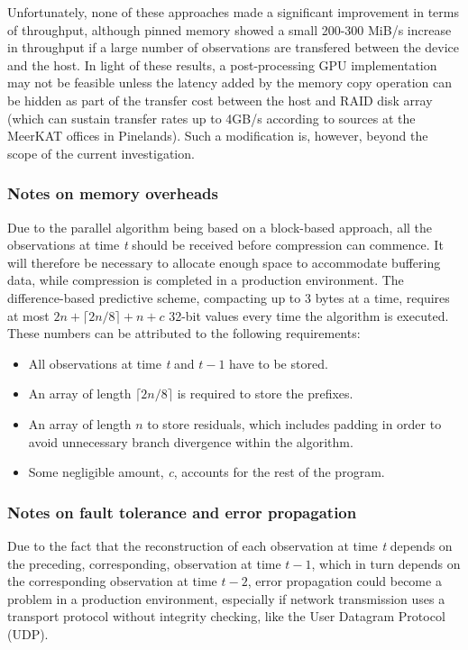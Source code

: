   Unfortunately, none of these approaches made a significant improvement in terms of throughput, although pinned memory showed a small 200-300 MiB/s increase in throughput if a large number of observations are transfered between the 
  device and the host. In light of these results, a post-processing GPU implementation may not be feasible unless the latency added by the memory copy operation can be hidden as part of the transfer cost between the host and RAID disk
  array (which can sustain transfer rates up to 4GB/s according to sources at the MeerKAT offices in Pinelands). Such a modification is, however, beyond the scope of the current investigation.
  \subsubsection{Notes on memory overheads}
  Due to the parallel algorithm being based on a block-based approach, all the observations at time \textit{t} should be received before compression can commence. It will therefore be necessary to allocate
  enough space to accommodate buffering data, while compression is completed in a production environment. The difference-based predictive scheme, compacting up to 3 bytes at a time, requires at most $2n + \lceil 2n/8 \rceil + n + c$ 32-bit values every 
  time the algorithm is executed. These numbers can be attributed to the following requirements:
  \begin{itemize}
   \item All observations at time \textit{t} and $t-1$ have to be stored.
   \item An array of length $\lceil 2n/8\rceil$ is required to store the prefixes.
   \item An array of length $n$ to store residuals, which includes padding in order to avoid unnecessary branch divergence within the algorithm.
   \item Some negligible amount, \textit{c}, accounts for the rest of the program. 
  \end{itemize}
  \subsubsection{Notes on fault tolerance and error propagation}
  Due to the fact that the reconstruction of each observation at time \textit{t} depends on the preceding, corresponding, observation at time $t-1$, which in turn 
  depends on the corresponding observation at time $t-2$, error propagation could become a problem in a production environment, especially if network transmission uses a transport
  protocol without integrity checking, like the User Datagram Protocol (UDP). 
  
